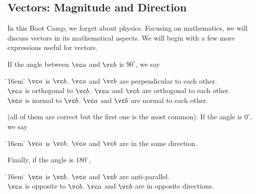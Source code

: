 \documentclass[11pt,pdfa,lastpage]{MishoNote}
\newcommand\fakebullet{\makebox[2.5em][r]{\textbullet\kern.5em}}
\begin{document}
\newpage

\subsection{Vectors: Magnitude and Direction}
In this Boot Camp, we forget about physics.
Focusing on mathematics, we will discuss vectors in its mathematical aspects.
We will begin with a few more expressions useful for vectors.

If the angle between $\vc a$ and $\vc b$ is $90^\circ$, we say
\begin{tabbing}
  \fakebullet \= \kern16em \=\kill
  \fakebullet \> $\vc a$ is  $\vc b$. \> \fakebullet $\vc a$ and $\vc b$ are perpendicular to each other.\\[\itemsep]
  \fakebullet \> $\vc a$ is orthogonal to $\vc b$.   \>    \fakebullet $\vc a$ and $\vc b$ are orthogonal  to each other.\\[\itemsep]
  \fakebullet \> $\vc a$ is normal to $\vc b$.       \>    \fakebullet $\vc a$ and $\vc b$ are normal to each other.
 \end{tabbing}
(all of them are correct but the first one is the most common). If the angle is $0^\circ$, we say
\begin{tabbing}
  \fakebullet \= \kern16em \=\kill
  \fakebullet \> $\vc a$ is  $\vc b$. \> \fakebullet $\vc a$ and $\vc b$ are in the same direction.
\end{tabbing}
Finally, if the angle is $180^\circ$,
\begin{tabbing}
  \fakebullet \= \kern16em \=\kill
  \fakebullet \> $\vc a$ is  $\vc b$. \> \fakebullet $\vc a$ and $\vc b$ are anti-parallel.\\[\itemsep]
  \fakebullet \> $\vc a$ is opposite to $\vc b$.      \> \fakebullet $\vc a$ and $\vc b$ are in opposite directions.
\end{tabbing}

\OutputNote
\end{document}
